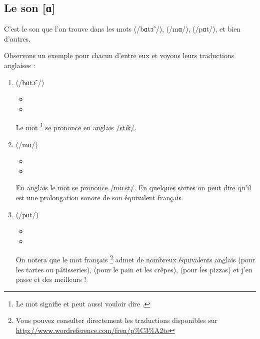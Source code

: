 \subsection{Le son [ɑ]}\label{subsec:ɑfr}

C'est le son que l'on trouve dans les mots  (/bɑtɔ̃ /),
 (/mɑ/),  (/pɑt/), et bien d'autres.

Observons un exemple pour chacun d'entre eux et voyons leurs
traductions anglaises :\par

\begin{enumerate}
\item {} (/bɑtɔ̃ /)
  \begin{itemize}
  \item {}
    \item {}
    \end{itemize}
    Le mot \footnote{Le mot  signifie  et
      peut aussi vouloir dire .} se prononce en anglais \href{https://en.oxforddictionaries.com/definition/stick}{/stɪk/}.
\item {} (/mɑ/)
  \begin{itemize}
  \item {}
  \item {}
  \end{itemize}
  En anglais le mot  se prononce
  \href{https://en.oxforddictionaries.com/definition/mast}{/mɑːst/}. En
  quelques sortes on peut dire qu'il est une prolongation sonore de son
  équivalent français.

  \item {} (/pɑt/)
    \begin{itemize}
    \item {}
    \item {}
    \end{itemize}
    On notera que le mot français \footnote{Vous pouvez consulter
      directement les traductions disponibles sur \url{http://www.wordreference.com/fren/p\%C3\%A2te}} admet de nombreux
    équivalents anglais  (pour les tartes ou
    pâtisseries),  (pour le pain et les crêpes),
     (pour les pizzas) et j'en passe et des meilleurs ! 
\end{enumerate}

